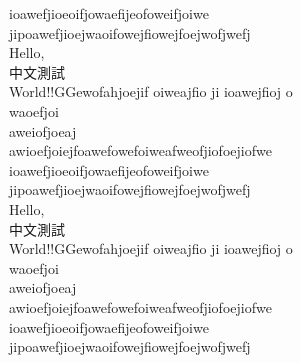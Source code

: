 \documentclass[12pt]{article}
\begin{document}
ioawefjioeoifjowaefijeofoweifjoiwe\\
jipoawefjioejwaoifowejfiowejfoejwofjwefj\\Hello, \\中文測試\\World!!GGewofahjoejif oiweajfio ji ioawejfioj o\\
waoefjoi\\
aweiofjoeaj\\
awioefjoiejfoawefowefoiweafweofjiofoejiofwe\\
ioawefjioeoifjowaefijeofoweifjoiwe\\
jipoawefjioejwaoifowejfiowejfoejwofjwefj\\Hello, \\中文測試\\World!!GGewofahjoejif oiweajfio ji ioawejfioj o\\
waoefjoi\\
aweiofjoeaj\\
awioefjoiejfoawefowefoiweafweofjiofoejiofwe\\
ioawefjioeoifjowaefijeofoweifjoiwe\\
jipoawefjioejwaoifowejfiowejfoejwofjwefj\\
\end{document}

